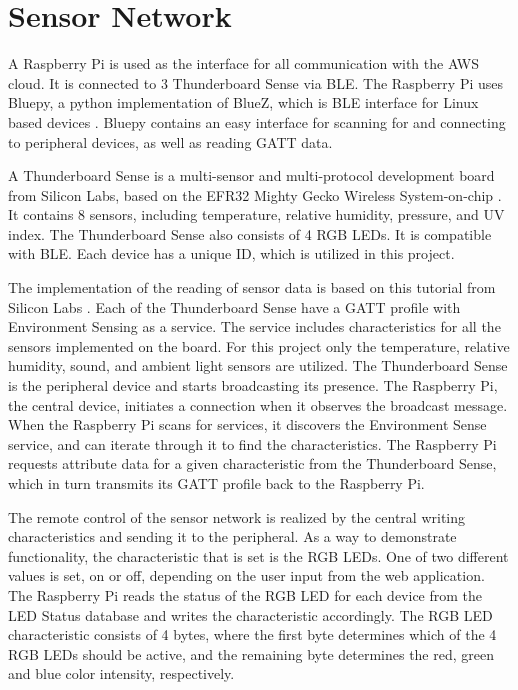 \chapter{Sensor Network}

A Raspberry Pi is used as the interface for all communication with the AWS cloud. It is connected to 3 Thunderboard Sense via BLE. The Raspberry Pi uses Bluepy, a python implementation of BlueZ, which is BLE interface for Linux based devices \cite{bluepy}. Bluepy contains an easy interface for scanning for and connecting to peripheral devices, as well as reading GATT data. 

A Thunderboard Sense is a multi-sensor and multi-protocol development board from Silicon Labs, based on the EFR32 Mighty Gecko Wireless System-on-chip \cite{TBs}. It contains 8 sensors, including temperature, relative humidity, pressure, and UV index. The Thunderboard Sense also consists of 4 RGB LEDs. It is compatible with BLE. Each device has a unique ID, which is utilized in this project.  

The implementation of the reading of sensor data is based on this tutorial from Silicon Labs \cite{TBScan}. Each of the Thunderboard Sense have a GATT profile with Environment Sensing as a service. The service includes characteristics for all the sensors implemented on the board. For this project only the temperature, relative humidity, sound, and ambient light sensors are utilized. The Thunderboard Sense is the peripheral device and starts broadcasting its presence. The Raspberry Pi, the central device, initiates a connection when it observes the broadcast message. When the Raspberry Pi scans for services, it discovers the Environment Sense service, and can iterate through it to find the characteristics. The Raspberry Pi requests attribute data for a given characteristic from the Thunderboard Sense, which in turn transmits its GATT profile back to the Raspberry Pi. 

The remote control of the sensor network is realized by the central writing characteristics and sending it to the peripheral. As a way to demonstrate functionality, the characteristic that is set is the RGB LEDs. One of two different values is set, on or off, depending on the user input from the web application. The Raspberry Pi reads the status of the RGB LED for each device from the LED Status database and writes the characteristic accordingly. The RGB LED characteristic consists of 4 bytes, where the first byte determines which of the 4 RGB LEDs should be active, and the remaining byte determines the red, green and blue color intensity, respectively. 

